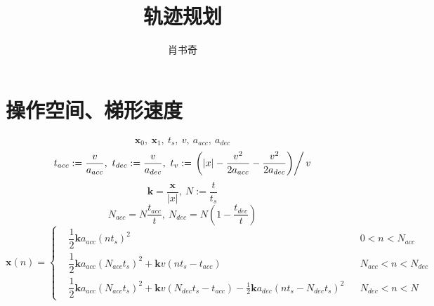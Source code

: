 \documentclass{tufte-handout}
\title{轨迹规划}
\author{肖书奇}
\begin{document}
\maketitle
\section{操作空间、梯形速度}
\[
    \mathbf x_0,\ \mathbf x_1,\ t_s,\ v,\ a_{acc},\ a_{dec}
\]
\[
    t_{acc} := \frac{v}{a_{acc}},\ t_{dec} := \frac{v}{a_{dec}},\ t_v := \left.\left(\vert x\vert-\frac{v^2}{2a_{acc}}-\frac{v^2}{2a_{dec}}\right)\right/v
\]
\[
    \mathbf k = \frac{\mathbf x}{\vert x\vert},\ N:=\frac{t}{t_s}
\]
\[
    N_{acc} = N\frac{t_{acc}}{t},\ N_{dec} = N(1-\frac{t_{dec}}{t})
\]
\[
    \mathbf x(n) = \left\{\begin{aligned}
         & \dfrac{1}{2}\mathbf k a_{acc}(nt_s)^2                                                                                     &  & 0<n<N_{acc}       \\
         & \dfrac{1}{2}\mathbf k a_{acc}(N_{acc}t_s)^2 + \mathbf k v(nt_s-t_{acc})                                                      &  & N_{acc}<n<N_{dec} \\
         & \dfrac{1}{2}\mathbf k a_{acc}(N_{acc}t_s)^2 + \mathbf k v(N_{dec}t_s-t_{acc}) - \frac{1}{2}\mathbf k a_{dec}(nt_s-N_{dec}t_s)^2 &  & N_{dec}<n<N
    \end{aligned}\right.
\]
\end{document}
